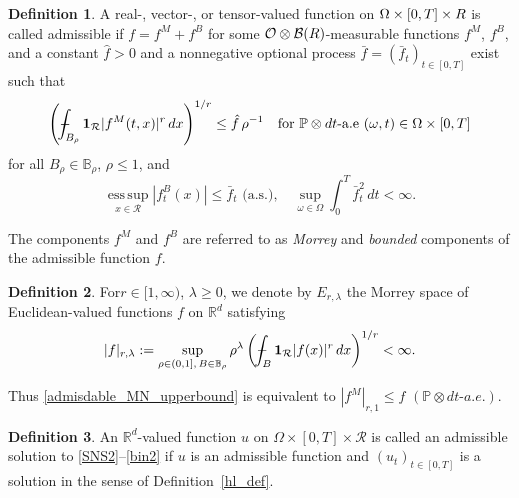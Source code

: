 \documentclass[11pt,reqno]{amsart}
\theoremstyle{definition}
\newtheorem{definition}{Definition}[section]
\theoremstyle{remark}
\newcommand\bR{\mathbb{R}}
\newcommand\cB{\mathcal{B}}
\newcommand\cO{\mathcal{O}}
\newcommand\cR{\mathcal{R}}
\newcommand{\<}{\langle}
\renewcommand{\>}{\rangle}
\def\Xint#1{\mathchoice
{\XXint\displaystyle\textstyle{#1}}%
{\XXint\textstyle\scriptstyle{#1}}%
{\XXint\scriptstyle\scriptscriptstyle{#1}}%
{\XXint\scriptscriptstyle\scriptscriptstyle{#1}}%
\!\int}
\def\XXint#1#2#3{{\setbox0=\hbox{$#1{#2#3}{\int}$ }
\vcenter{\hbox{$#2#3$ }}\kern-.6\wd0}}
\def\dashint{\Xint-}
\begin{document}
\begin{definition}
                                                                 \label{definition admissible}
A real-, vector-, or tensor-valued function
on $\Omega\times[0,T]\times\mathbb \cR$
is called admissible if
$f=f^M+f^B$  
for some $\cO\otimes\cB(\mathbb\cR)$-measurable 
functions $f^M$, $f^B$, and 
a constant $\hat f>0$ and a nonnegative optional process
$\bar f=(\bar f_t)_{t\in[0,T]}$ exist such that 
\begin{equation}
                                              \label{admisdable_MN_upperbound}
\left(
\dashint_{B_\rho}{\bf1}_{\cR}|f^M(t,x)|^r\,dx
\right)^{1/r}
\le
\hat f\,\rho^{-1} \quad \text{for $\mathbb{P}\otimes dt$-a.e 
$(\omega,t)\in\Omega\times[0,T]$}
\end{equation}
for all $B_\rho\in\mathbb B_\rho$, $\rho\leq1$, 
and
\begin{equation}
                                               \label{admissible_essup_upperbound}
\operatorname*{ess\,sup}_{x\in\cR}
|f_t^B(x)|
\leq \bar f_t \,\, \text{(a.s.)},
\quad
\sup_{\omega\in\Omega}
\int_0^T \bar f_t^2\,dt<\infty.
\end{equation}
\end{definition}
The components $f^M$ and $f^B$ are referred to as {\it Morrey} and 
{\it bounded} components of the admissible function $f$. 
\begin{definition}
For$r\in[1,\infty)$, $\lambda\ge0$, we denote by
$E_{r,\lambda}$ the Morrey space of Euclidean-valued functions $f$ 
on $\bR^d$ satisfying
$$
|f|_{r,\lambda}:=\sup_{\rho\in(0,1],\,B\in\mathbb B_\rho}
\rho^\lambda\left(\dashint_{B} {\bf1}_{\cR}|f(x)|^r\,dx\right)^{1/r}<\infty.
$$
\end{definition}
Thus \eqref{admisdable_MN_upperbound} is equivalent to
$
|f^M|_{r,1}\le \hat f 
$ $( \mathbb{P}\otimes dt \text{-}a.e.)$.


\begin{definition}
                                                                          \label{definition AS} 
An $\mathbb R^d$-valued function $u$ 
on $\Omega\times[0,T]\times\cR$ is called an admissible solution to
\eqref{SNS2}--\eqref{bin2} if $u$ is an admissible function and
$(u_t)_{t\in[0,T]}$
is a solution in the sense of Definition~\ref{hl_def}.
\end{definition}
\end{document}
